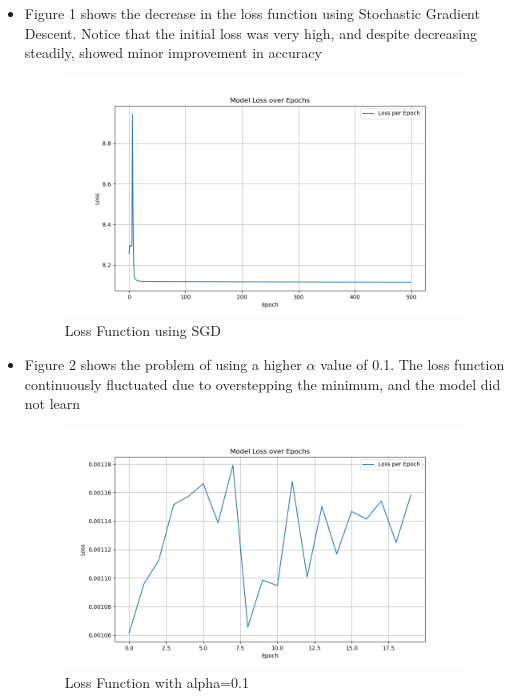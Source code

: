 \documentclass[11pt]{article}
\begin{document}
\begin{itemize}
    \item Figure 1 shows the decrease in the loss function using Stochastic Gradient Descent. Notice that the initial loss was very high, and despite decreasing steadily, showed minor improvement in accuracy

\begin{figure}[H]
    \centering
    \includegraphics[width=0.8\linewidth]{loss_sgd.png}
    \caption{Loss Function using SGD}
\end{figure}
    
    \item Figure 2 shows the problem of using a higher $\alpha$ value of 0.1. The loss function continuously fluctuated due to overstepping the minimum, and the model did not learn

\begin{figure}[H]
    \centering
    \includegraphics[width=0.8\linewidth]{loss_highalpha.png}
    \caption{Loss Function with alpha=0.1}
\end{figure}
    

\end{itemize}
\end{document}
